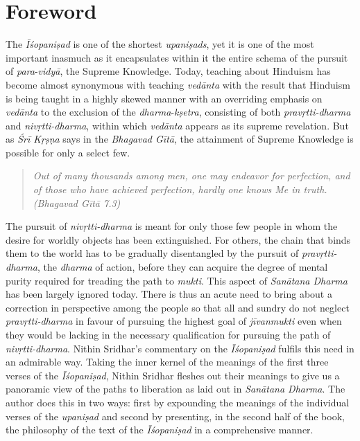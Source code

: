\chapter{Foreword}

The \emph{Īśopaniṣad} is one of the shortest \emph{upaniṣads}, yet it is one of the most important inasmuch as it encapsulates within it the entire schema of the pursuit of \emph{para}-\emph{vidyā}, the Supreme Knowledge. Today, teaching about Hinduism has become almost synonymous with teaching \emph{vedānta} with the result that Hinduism is being taught in a highly skewed manner with an overriding emphasis on \emph{vedānta} to the exclusion of the \emph{dharma}-\emph{kṣetra}, consisting of both \emph{pravṛtti-dharma} and \emph{nivṛtti-dharma}, within which \emph{vedānta} appears as its supreme revelation. But as \emph{Śrī Kṛṣṇa} says in the \emph{Bhagavad Gītā}, the attainment of Supreme Knowledge is possible for only a select few.

\begin{quote}
\emph{Out of many thousands among men, one may endeavor for perfection, and of those who have achieved perfection, hardly one knows Me in truth. (Bhagavad Gītā 7.3)}
\end{quote}

The pursuit of \emph{nivṛtti-dharma} is meant for only those few people in whom the desire for worldly objects has been extinguished. For others, the chain that binds them to the world has to be gradually disentangled by the pursuit of \emph{pravṛtti-dharma}, the \emph{dharma} of action, before they can acquire the degree of mental purity required for treading the path to \emph{mukti}. This aspect of \emph{Sanātana Dharma} has been largely ignored today. There is thus an acute need to bring about a correction in perspective among the people so that all and sundry do not neglect \emph{pravṛtti-dharma} in favour of pursuing the highest goal of \emph{jīvanmukti} even when they would be lacking in the necessary qualification for pursuing the path of \emph{nivṛtti-dharma}. Nithin Sridhar's commentary on the \emph{Īśopaniṣad} fulfils this need in an admirable way. Taking the inner kernel of the meanings of the first three verses of the \emph{Īśopaniṣad}, Nithin Sridhar fleshes out their meanings to give us a panoramic view of the paths to liberation as laid out in \emph{Sanātana Dharma}. The author does this in two ways: first by expounding the meanings of the individual verses of the \emph{upaniṣad} and second by presenting, in the second half of the book, the philosophy of the text of the \emph{Īśopaniṣad} in a comprehensive manner.

